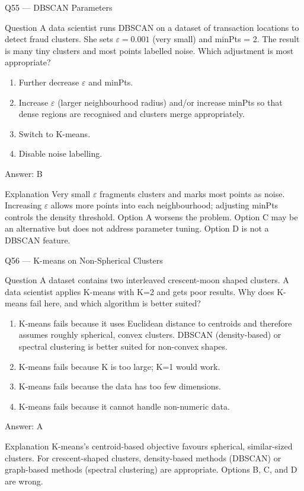 \documentclass[aspectratio=169,8pt]{beamer}
\begin{document}
	\begin{frame}{Q55 --- DBSCAN Parameters}
		\begin{block}{Question}
			A data scientist runs DBSCAN on a dataset of transaction locations to detect fraud clusters. She sets $\varepsilon = 0.001$ (very small) and minPts = 2. The result is many tiny clusters and most points labelled noise. Which adjustment is most appropriate?
		\end{block}
		\begin{enumerate}
			\item Further decrease $\varepsilon$ and minPts.
			\item Increase $\varepsilon$ (larger neighbourhood radius) and/or increase minPts so that dense regions are recognised and clusters merge appropriately.
			\item Switch to K-means.
			\item Disable noise labelling.
		\end{enumerate}
		\begin{exampleblock}{Answer: B}\end{exampleblock}
		\begin{block}{Explanation}
			Very small $\varepsilon$ fragments clusters and marks most points as noise. Increasing $\varepsilon$ allows more points into each neighbourhood; adjusting minPts controls the density threshold. Option A worsens the problem. Option C may be an alternative but does not address parameter tuning. Option D is not a DBSCAN feature.
		\end{block}
	\end{frame}
	
	\begin{frame}{Q56 --- K-means on Non-Spherical Clusters}
		\begin{block}{Question}
			A dataset contains two interleaved crescent-moon shaped clusters. A data scientist applies K-means with K=2 and gets poor results. Why does K-means fail here, and which algorithm is better suited?
		\end{block}
		\begin{enumerate}
			\item K-means fails because it uses Euclidean distance to centroids and therefore assumes roughly spherical, convex clusters. DBSCAN (density-based) or spectral clustering is better suited for non-convex shapes.
			\item K-means fails because K is too large; K=1 would work.
			\item K-means fails because the data has too few dimensions.
			\item K-means fails because it cannot handle non-numeric data.
		\end{enumerate}
		\begin{exampleblock}{Answer: A}\end{exampleblock}
		\begin{block}{Explanation}
			K-means's centroid-based objective favours spherical, similar-sized clusters. For crescent-shaped clusters, density-based methods (DBSCAN) or graph-based methods (spectral clustering) are appropriate. Options B, C, and D are wrong.
		\end{block}
	\end{frame}
	
\end{document}
